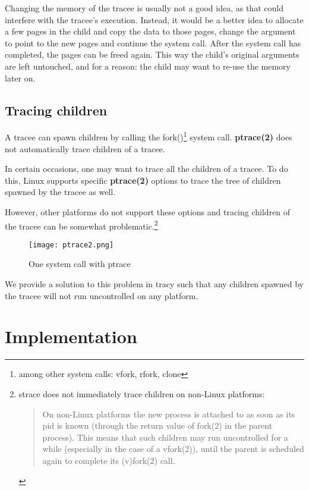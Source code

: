 \documentclass[a4paper, twoside, 10pt]{report}
\begin{document}
Changing the memory of the tracee is usually not a good idea, as that could
interfere with the tracee's execution.
Instead, it would be a better idea to allocate a few pages in the
child and copy the data to those pages, change the argument to point to the new
pages and continue the system call. After the system call has completed, the
pages can be freed again. This way the child's original arguments are left
untouched, and for a reason: the child may want to re-use the memory later on.

\section{Tracing children}

A tracee can spawn children by calling the fork()\footnote{among other system
calls: vfork, rfork, clone} system call. \textbf{ptrace(2)} does not
automatically trace children of a tracee.

In certain occasions, one may want to trace all the children of a tracee.
To do this, Linux supports specific \textbf{ptrace(2)} options to trace
the tree of children spawned by the tracee as well.

However, other platforms do not support these options and tracing
children of the tracee can be somewhat problematic.\footnote{strace does not
immediately trace children on non-Linux platforms:
\begin{quote}
    On non-Linux platforms the new process is attached to as soon as its pid is
    known (through the return value of fork(2) in the parent process).
    This means that such children may run uncontrolled for a while
    (especially in the case of a vfork(2)), until the parent is scheduled
    again to complete its (v)fork(2)  call.
\end{quote}
}

\begin{figure}
\label{fig2}
\texttt{[image: ptrace2.png]}
\caption{One system call with ptrace}
\end{figure}

We provide a solution to this problem in tracy such that any children spawned
by the tracee will not run uncontrolled on any platform.

\chapter{Implementation}
\end{document}
